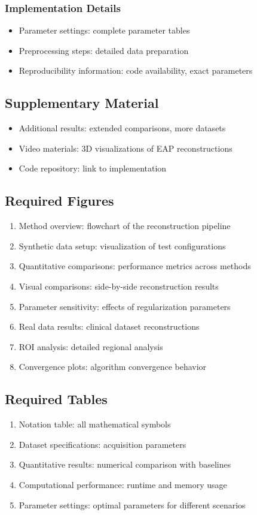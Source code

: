 \documentclass[journal,twoside,web]{ieeecolor}
\begin{document}
\subsubsection{Implementation Details}
\begin{itemize}
    \item Parameter settings: complete parameter tables
    \item Preprocessing steps: detailed data preparation
    \item Reproducibility information: code availability, exact parameters
\end{itemize}

\subsection{Supplementary Material}
\begin{itemize}
    \item Additional results: extended comparisons, more datasets
    \item Video materials: 3D visualizations of EAP reconstructions
    \item Code repository: link to implementation
\end{itemize}

\subsection{Required Figures}
\begin{enumerate}
    \item Method overview: flowchart of the reconstruction pipeline
    \item Synthetic data setup: visualization of test configurations
    \item Quantitative comparisons: performance metrics across methods
    \item Visual comparisons: side-by-side reconstruction results
    \item Parameter sensitivity: effects of regularization parameters
    \item Real data results: clinical dataset reconstructions
    \item ROI analysis: detailed regional analysis
    \item Convergence plots: algorithm convergence behavior
\end{enumerate}

\subsection{Required Tables}
\begin{enumerate}
    \item Notation table: all mathematical symbols
    \item Dataset specifications: acquisition parameters
    \item Quantitative results: numerical comparison with baselines
    \item Computational performance: runtime and memory usage
    \item Parameter settings: optimal parameters for different scenarios
\end{enumerate}
\end{document}
